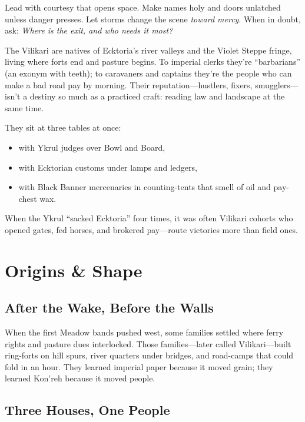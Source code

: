 \documentclass[11pt,letterpaper]{article}
\begin{document}
Lead with courtesy that opens space. Make names holy and doors unlatched unless danger presses. Let storms change the scene \emph{toward mercy}. When in doubt, ask: \emph{Where is the exit, and who needs it most?}


The Vilikari are natives of Ecktoria's river valleys and the Violet Steppe fringe, living where forts end and pasture begins. To imperial clerks they're ``barbarians'' (an exonym with teeth); to caravaners and captains they're the people who can make a bad road pay by morning. Their reputation---hustlers, fixers, smugglers---isn't a destiny so much as a practiced craft: reading law and landscape at the same time.

They sit at three tables at once:
\begin{itemize}
\item with Ykrul judges over Bowl and Board,
\item with Ecktorian customs under lamps and ledgers,
\item with Black Banner mercenaries in counting-tents that smell of oil and pay-chest wax.
\end{itemize}

When the Ykrul ``sacked Ecktoria'' four times, it was often Vilikari cohorts who opened gates, fed horses, and brokered pay---route victories more than field ones.

\section{Origins \& Shape}

\subsection{After the Wake, Before the Walls}

When the first Meadow bands pushed west, some families settled where ferry rights and pasture dues interlocked. Those families---later called Vilikari---built ring-forts on hill spurs, river quarters under bridges, and road-camps that could fold in an hour. They learned imperial paper because it moved grain; they learned Kon'reh because it moved people.

\subsection{Three Houses, One People}
\end{document}
